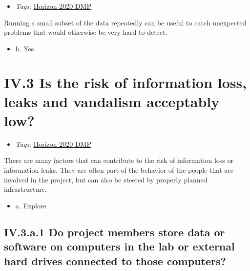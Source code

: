 \documentclass[a4paper,12pt]{report}
\begin{document}
\begin{itemize}
  \item \textit{Tags}: \ul{Horizon 2020 DMP}
  \end{itemize}


\noindent
\begin{markdown}
Running a small subset of the data repeatedly can be useful to catch unexpected problems that would otherwise be very hard to detect.
\end{markdown}



\begin{itemize}
  \item[\CheckmarkBold] b. Yes
\end{itemize}






\section*{\protect\textcolor{colorSecId}{IV.3} Is the risk of information loss, leaks and vandalism acceptably low?}

\label{10a10ffd-bfe1-4c6b-bbb6-3dfb1e63a5d5.614ab69d-55a6-4214-b384-00ba21ce92a1}


\begin{itemize}
  \item \textit{Tags}: \ul{Horizon 2020 DMP}
  \end{itemize}


\noindent
\begin{markdown}
There are many factors that can contribute to the risk of information loss or information leaks. They are often part of the behavior of the people that are involved in the project, but can also be steered by properly planned infrastructure.
\end{markdown}



\begin{itemize}
  \item[\CheckmarkBold] a. Explore
\end{itemize}




\subsection*{\protect\textcolor{colorSecId}{IV.3.a.1} Do project members store data or software on computers in the lab or external hard drives connected to those computers?}
\end{document}

